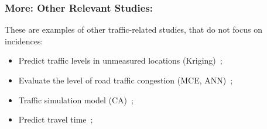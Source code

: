 \documentclass[hyperref={pdfpagelabels=true}]{beamer}
\begin{document}
\begin{frame}
\frametitle{More: Other Relevant Studies:}
These are examples of other traffic-related studies, that do not focus on incidences:
\begin{itemize}
\item Predict traffic levels in unmeasured locations (Kriging)~\cite{kriging};
\item Evaluate the level of road traffic congestion (MCE, ANN)~\cite{congestion};%
\item Traffic simulation model (CA)~\cite{ca};%
\item Predict travel time~\cite{traveltime};%
\end{itemize}
\end{frame}

\end{document}
